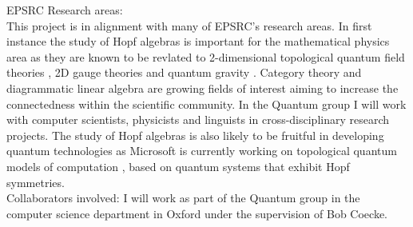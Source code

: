 \documentclass{article}
\begin{document}
EPSRC Research areas:\\
This project is in alignment with many of EPSRC’s research areas. In first instance the study of Hopf algebras is important for the mathematical physics area as they are known to be revlated to 2-dimensional topological quantum field theories \cite{Balsam12}, 2D gauge theories and quantum gravity \cite{Majid95}. Category theory and diagrammatic linear algebra are growing fields of interest aiming to increase the connectedness within the scientific community. In the Quantum group I will work with computer scientists, physicists and linguists in cross-disciplinary research projects. The study of Hopf algebras is also likely to be fruitful in developing quantum technologies as Microsoft is currently working on topological quantum models of computation \cite{Gibney16}, based on quantum systems that exhibit Hopf symmetries.\\

Collaborators involved: I will work as part of the Quantum group in the computer science department in Oxford under the supervision of Bob Coecke.



\end{document}
